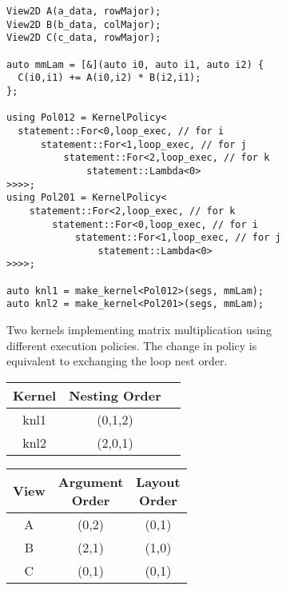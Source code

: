 \begin{figure*}
\begin{subfigure}[b]{0.52\columnwidth}
\begin{lstlisting}
View2D A(a_data, rowMajor); 
View2D B(b_data, colMajor); 
View2D C(c_data, rowMajor);

auto mmLam = [&](auto i0, auto i1, auto i2) {
  C(i0,i1) += A(i0,i2) * B(i2,i1);
};
  
using Pol012 = KernelPolicy< 
  statement::For<0,loop_exec, // for i
	  statement::For<1,loop_exec, // for j
		  statement::For<2,loop_exec, // for k
			  statement::Lambda<0>
>>>>;
using Pol201 = KernelPolicy< 
	statement::For<2,loop_exec, // for k
		statement::For<0,loop_exec, // for i
			statement::For<1,loop_exec, // for j
				statement::Lambda<0>
>>>>;

auto knl1 = make_kernel<Pol012>(segs, mmLam);
auto knl2 = make_kernel<Pol201>(segs, mmLam);
\end{lstlisting}
\caption{Two kernels implementing matrix multiplication using different execution policies. The change in policy is equivalent to exchanging the loop nest order.}\label{accessOrder:code}
\end{subfigure}
\hspace{0.01\columnwidth}
	\begin{subfigure}[b]{0.45\columnwidth}
		\begin{center}
			\begin{tabular} {|c|c|c|}
\hline{}
Kernel & Nesting Order \\ \hline
knl1 & (0,1,2) \\
knl2 & (2,0,1) \\
\hline
			\end{tabular}

			\vspace{5px}

			\begin{tabular} {|c|c|c|}
				\hline 
				View & \makecell{Argument \\ Order} & \makecell{Layout \\ Order} \\  \hline 
				A & (0,2) & (0,1) \\ 
				B & (2,1) & (1,0) \\
				C & (0,1) & (0,1) \\
				\hline
			\end{tabular}

\vspace{5px}


\end{center}
\end{subfigure}
\end{figure*}
